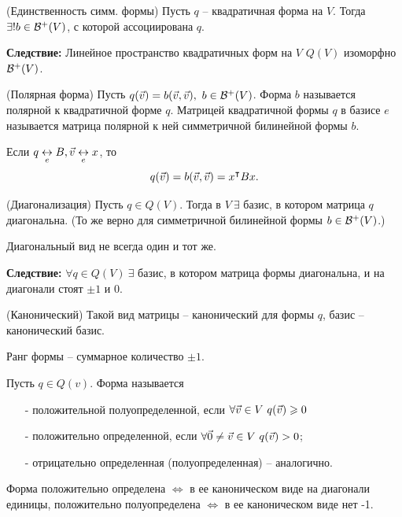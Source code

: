 \begin{multicols}{2}
\begin{theorema}{(Единственность симм. формы)}{}
    Пусть $q$ -- квадратичная форма на $V$. Тогда $\exists ! b \in \mathcal{B}^+(V)$, с которой ассоциирована $q$.
\end{theorema}
\textbf{Следствие:} Линейное пространство квадратичных форм на $V$ $Q(V)$ изоморфно $\mathcal{B}^+(V)$.
\begin{definition}{(Полярная форма)}{}
    Пусть $q(\vec{v}) = b(\vec{v}, \vec{v}), \ b\in \mathcal{B}^+(V)$. Форма $b$ называется полярной к квадратичной форме $q$. Матрицей квадратичной формы $q$ в базисе $e$ называется матрица полярной к ней симметричной билинейной формы $b$.
\end{definition}
\begin{note}{}{}
    Если $q\underset{e}{\leftrightarrow} B, \vec{v} \underset{e}{\leftrightarrow} x$, то 
    \[
        q(\vec{v}) = b(\vec{v}, \vec{v}) = x^{\intercal} Bx.  
    \]
\end{note}
\begin{theorema}{(Диагонализация)}{}
    Пусть $q \in Q(V)$. Тогда в $V \ \exists $ базис, в котором матрица $q$ диагональна. (То же верно для симметричной билинейной формы $b\in \mathcal{B}^+(V)$.)  
\end{theorema}
\begin{note}{}{}
    Диагональный вид не всегда один и тот же.
\end{note}
\textbf{Следствие: } $\forall q \in Q(V) \ \exists$ базис, в котором матрица формы диагональна, и на диагонали стоят $\pm 1$ и $0$.
\begin{definition}{(Канонический)}{}
    Такой вид матрицы -- канонический для формы $q$, базис -- канонический базис.
\end{definition}
Ранг формы -- суммарное количество $\pm 1$.
\begin{definition}{}{}
    Пусть $q \in Q(v)$. Форма называется 
    \begin{itemize}
        \item[-] положительной полуопределенной, если $\forall \vec{v} \in V \ q(\vec{v}) \geqslant 0$
        \item[-] положительно определенной, если $\forall \vec{0} \neq \vec{v} \in V\ q(\vec{v}) > 0$;
        \item[-]  отрицательно определенная (полуопределенная) -- аналогично.
    \end{itemize}
\end{definition}
Форма положительно определена $\Leftrightarrow$ в ее каноническом виде на диагонали единицы, положительно полуопределена $\Leftrightarrow$ в ее каноническом виде нет -1.

\end{multicols}
